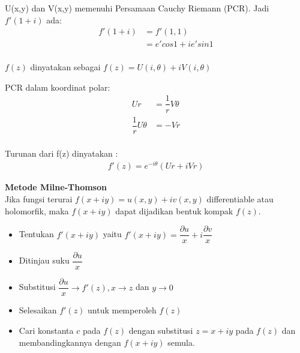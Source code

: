 \documentclass{article}
\begin{document}
    U(x,y) dan V(x,y) memenuhi Persamaan Cauchy Riemann (PCR). Jadi $f'(1+i)$ ada:
    \begin{align}
        f'(1+i) &= f'(1,1)
                \nonumber\\
                &= e'cos 1 + i e'sin 1
                \nonumber\\
                \nonumber
    \end{align}


    $f(z)$ dinyatakan sebagai $f(z) = U(i,\theta)+ iV(i,\theta)$
    
    PCR dalam koordinat polar:
    \begin{align}
        Ur  &= \dfrac{1}{r}V\theta
        \nonumber\\
        \dfrac{1}{r}U\theta &= -Vr
        \nonumber\\
        \nonumber
    \end{align}

    Turunan dari f(z) dinyatakan :
    \begin{align}
        f'(z) = e^{-i\theta}(Ur+iVr)
    \end{align}

    \newpage
    \textbf{Metode Milne-Thomson}
    \leavevmode\\
    
    Jika fungsi terurai $f(x+iy)=u(x,y) + iv(x,y)$  differentiable atau holomorfik, maka $f(x+iy)$ dapat dijadikan bentuk kompak $f(z)$.

    \begin{itemize}
        \item Tentukan $f'(x+iy)$ yaitu $f'(x+iy) = \dfrac{\partial u}{x} + i \dfrac{\partial v}{x}$
        \item Ditinjau suku $\dfrac{\partial u}{x}$
        \item Substitusi $\dfrac{\partial u}{x} \rightarrow  f'(z), x \rightarrow z$ dan $y \rightarrow 0$
        \item Selesaikan $f'(z)$ untuk memperoleh $f(z)$
        \item Cari konstanta $c$ pada $f(z)$ dengan substitusi $z = x +iy$ pada $f(z)$ dan membandingkannya dengan $f(x+iy)$ semula. 
    \end{itemize}
\end{document}
